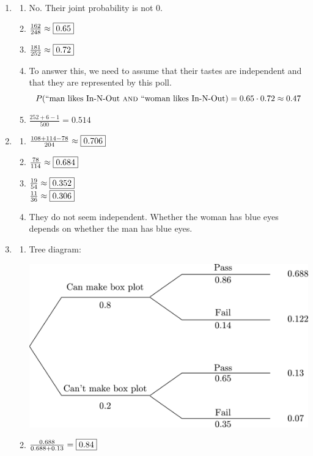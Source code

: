 \documentclass[12pt,letterpaper]{article}
\begin{document}
\begin{enumerate}
\item \begin{enumerate}
	\item No. Their joint probability is not 0.
	\item $\frac{162}{248} \approx \fbox{0.65}$
	\item $\frac{181}{252} \approx \fbox{0.72} $
	\item To answer this, we need to assume that their tastes are independent and that they are represented by this poll. $$P(\text{``man likes In-N-Out}~\textsc{and}~\text{``woman likes In-N-Out}) = 0.65 \cdot 0.72 \approx 0.47  $$
	\item $\frac{252+6-1}{500} = 0.514$
\end{enumerate}

\item \begin{enumerate}
	\item $\frac{108+114-78}{204} \approx \fbox{0.706} $
	\item $\frac{78}{114} \approx \fbox{0.684} $
	\item $\frac{19}{54} \approx \fbox{0.352} $ \\
	      $\frac{11}{36} \approx \fbox{0.306} $
	\item They do not seem independent. Whether the woman has blue eyes depends on whether the man has blue eyes.
\end{enumerate}

\item \begin{enumerate}
	\item Tree diagram:
	\begin{center}
	\includegraphics[scale=0.6]{figures/tree.png}
	\end{center}
	\item $\frac{0.688}{0.688+0.13} = \fbox{0.84}$
\end{enumerate}

\end{enumerate}
\end{document}
